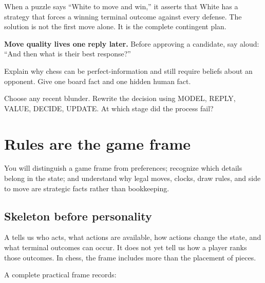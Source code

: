 When a puzzle says ``White to move and win,'' it asserts that White has a strategy that forces a winning terminal outcome against every defense. The solution is not the first move alone. It is the complete contingent plan.

\begin{memorybox}
\textbf{Move quality lives one reply later.} Before approving a candidate, say aloud: ``And then what is their best response?''
\end{memorybox}

\begin{exercise}
Explain why chess can be perfect-information and still require beliefs about an opponent. Give one board fact and one hidden human fact.
\end{exercise}

\begin{exercise}
Choose any recent blunder. Rewrite the decision using MODEL, REPLY, VALUE, DECIDE, UPDATE. At which stage did the process fail?
\end{exercise}


\chapter{Rules are the game frame}
\begin{learningbox}
You will distinguish a game frame from preferences; recognize which details belong in the state; and understand why legal moves, clocks, draw rules, and side to move are strategic facts rather than bookkeeping.
\end{learningbox}

\section{Skeleton before personality}
A  tells us who acts, what actions are available, how actions change the state, and what terminal outcomes can occur. It does not yet tell us how a player ranks those outcomes. In chess, the frame includes more than the placement of pieces.

A complete practical frame records:

